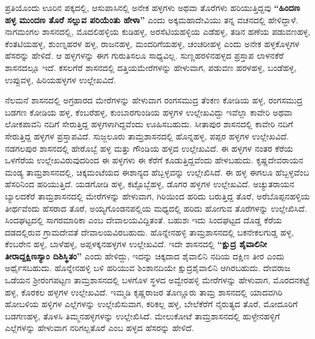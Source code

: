 ಪ್ರತಿಯೊಂದು ಊರಿನ ಪಕ್ಕದಲ್ಲಿ, ಆಸುಪಾಸಿನಲ್ಲಿ ಅನೇಕ ಹಳ್ಳಗಳು ಅಥವಾ ತೊರೆಗಳು ಹರಿಯುತ್ತಿದ್ದವು \textbf{“ಹಿಂದಣ ಹಳ್ಳ ಮುಂದಣ ತೊರೆ ಸಲ್ಲುವ ಪರಿಯೆಂತು ಹೇಳಾ”} ಎಂದು ಅಕ್ಕಮಹಾದೇವಿಯು ತನ್ನ ವಚನದಲ್ಲಿ ಹೇಳಿದ್ದಾಳೆ. ನಾಗಮಂಗಲ ಶಾಸನದಲ್ಲಿ, ಮೊದಲಿಹಳ್ಳಿಯ ಕುಡಿಹಳ್ಳ, ಅರಸೆಟಿಯಹಳ್ಳಿಯ ಎಡೆಹಳ್ಳ, ತಡಿನ ಹಣೆಯ ಪಡುವಣಹಳ್ಳ, ಕೆಂತಟಿಯಹಳ್ಳ, ಶುಂಣ್ನಹರಳ ಹಳ್ಳ, ರಾಜನಹಳ್ಳ, ಮಂದರಿಗೆಯಹಳ್ಳ, ಚಂಚರೀಹಳ್ಳ ಎಂದು ಅನೇಕ ಹಳ್ಳಕೊಳ್ಳಗಳ ಹೆಸರನ್ನು ಹೇಳಿದೆ. ಆ ಹಳ್ಳಗಳನ್ನು ಈಗ ಗುರುತಿಸಲೂ ಸಾಧ್ಯವಿಲ್ಲ. ಸುಣ್ಣಹರಳಿನಹಳ್ಳದ ಪ್ರಸ್ತಾಪ ಲಾಳನಕೆರೆ ಶಾಸನದಲ್ಲೂ ಇದೆ. ಕಸಲಗೆರೆ ಶಾಸನದಲ್ಲಿ ದತ್ತಿಯಮೇರೆಗಳನ್ನು ಹೇಳುವಾಗ, ಪಡುವಣ ಹರಳಹಳ್ಳ, ಬಂಡೆಹಳ್ಳ, ಉಪ್ಪುವಳ್ಳ, ಹಿರಿಯಹಳ್ಳಗಳ ಉಲ್ಲೇಖವಿದೆ.

ನೆಲಮನೆ ಶಾಸನದಲ್ಲಿ ಅಗ್ರಹಾರದ ಮೇರೆಗಳನ್ನು ಹೇಳುವಾಗ ರಂಗಸಮುದ್ರ ತೆಂಕಣ ಕೋಡಿಯ ಹಳ್ಳ, ರಂಗಸಮುದ್ರ ಬಡಗಣ ಕೋಡಿಯ ಹಳ್ಳ, ಕೆಂಬರೆಹಳ್ಳ, ಕುಂಬಾರಗುಂಡಿಯ ಹಳ್ಳಗಳ ಉಲ್ಲೇಖವಿದ್ದು ಇವೆಲ್ಲಾ ಕಾವೇರಿ ಅಥವಾ ಲೋಕಪಾವನಿ ನದಿಗೆ ಸೇರುತ್ತಿದ್ದ ಹಳ್ಳಗಳಾಗಿದ್ದವೆಂದು ಊಹಿಸಬಹುದು. ಸೀತಾಪುರ ಶಾಸನದಲ್ಲಿ ಕಾವೇರಿ ನದಿಗೆ ಸೇರುತ್ತಿದ್ದ ಹಳ್ಳಗಳ ಪ್ರಸ್ತಾಪವಿದೆ. ಸುಜ್ಜಲೂರು ತಾಮ್ರಶಾಸನದಲ್ಲಿ ಹೊನ್ನಹಳ್ಳ, ಪಪ್ಪರ ಹಳ್ಳಗಳ ಉಲ್ಲೇಖವಿದೆ. ನಡಗಲಪುರ ಶಾಸನದಲ್ಲಿ ಹೇರೊಬ್ಬೆ ಹಳ್ಳ ಮತ್ತು ಗೌಂಡಿಯ ಹಳ್ಳದ ಉಲ್ಲೇಖವಿದೆ. ಈ ಹಳ್ಳಗಳ ನಂತರ ಕೆರೆಯ ಒಳಗೆರೆಯ ಉಲ್ಲೇಖವಿರುವುದರಿಂದ ಈ ಹಳ್ಳಗಳು ಈ ಕೆರೆಗೆ ಕೂಡುತ್ತಿದ್ದವೆಂದು ಹೇಳಬಹುದು. ಕೃಷ್ಣದೇವರಾಯನ ಮಂಡ್ಯ ತಾಮ್ರಶಾಸನದಲ್ಲಿ, ಚಿಕ್ಕಮಂಟೆಯದ ಈಶಾನ್ಯದ ಹೆಬ್ಬಳ್ಳವನ್ನು ಉಲ್ಲೇಖಿಸಿದೆ. ಈ ಹಳ್ಳ ಈಗಲೂ ಹೆಬ್ಬಳ್ಳವೆಂಬ ಹೆಸರಿನಿಂದ ಹರಿಯುತ್ತಿದೆ. ಯಡಗೋಡಿ ಹಳ್ಳ, ಕಟ್ಟೊಬ್ಬೆ\-ಹಳ್ಳ, ಡೊಗರ ಹಳ್ಳಗಳ ಉಲ್ಲೇಖವಿದೆ. ಅಚ್ಯುತರಾಯನ ಬ್ಯಾಲದಕೆರೆ ತಾಮ್ರಶಾಸನದಲ್ಲಿ ಮೇರೆಗಳನ್ನು ಹೇಳುವಾಗ, ಗಿರಿಯಿಂದ ಹರಿದು ಬರುತ್ತಿದ್ದ ತೊರೆ, ಅರೆಬೊಪ್ಪನಹಳ್ಳಿಯ ತೀರ್ಥವೆಂದು ಹೆಸರಾದ ತೊರೆ, ಅಯ್ಯಗೊಂಡನಪಲ್ಲಿಯ ಮಧ್ಯದಲ್ಲಿ ಹರಿದು ಹೋಗುವ ತೊರೆಗಳನ್ನು ಉಲ್ಲೇಖಿಸಿದೆ. ಸಿಂದಘಟ್ಟದಲ್ಲಿ ಸಾಗರಮಾರಿಕಾ ಎಂಬ ದೇವಾಲಯವಿದ್ದಿತಂತೆ. ಬಹುಶಃ ಇದು ಸಿಂದಘಟ್ಟದ ದೊಡ್ಡ ಕೆರೆಯ ದಡದಲ್ಲಿರುವ ಗ್ರಾಮದೇವತೆ ದೇವಾಲಯವಿರಬಹುದು. ಹೊನ್ನೇನಹಳ್ಳಿ ತಾಮ್ರಶಾಸನದಲ್ಲಿ ಬಕನೇಕಲಗುಡ್ಡ ಹಳ್ಳ, ಕೆಂಬರೇನ ಹಳ್ಳ, ಬಾಳೆಹಳ್ಳ, ಅಪ್ಪಳಕ್ಕನಹಳ್ಳಗಳ ಉಲ್ಲೇಖವಿದೆ. ಇದೇ ಶಾಸನದಲ್ಲಿ \textbf{“ಕ್ಷುದ್ರ ಶೈವಾಲಿನೀ ತೀರಾದ್ದಕ್ಷಿಣಸ್ಯಾಂ ದಿಶಿಸ್ಥಿತಂ”} ಎಂದು ಹೇಳಿದ್ದು, ಇದನ್ನು ಚಿಕ್ಕದಾದ ಶೈವಾಲಿನಿ ನದಿಯ ದಕ್ಷಿಣ ತೀರ ಎಂದು ಅರ್ಥೈಸಬಹುದು. ಹೊನ್ನೇನಹಳ್ಳಿ ಬಳಿ ಹರಿಯುವ ಶಿಂಶಾನದಿಯೇ ಕ್ಷುದ್ರಶೈವಾಲಿನಿ ಆಗಿರಬಹುದು. ದೇವರಾಜ ಒಡೆಯನ ಶ‍್ರೀರಂಗಪಟ್ಟಣ ತಾಮ್ರಶಾಸನದಲ್ಲಿ ಬಳಗೊಳ ಸ್ಥಳದ ಅವ್ವೇರಹಳ್ಳಿ ಮೇರೆಗಳನ್ನು ಹೇಳುವಾಗ, ಮೊರದನಕಟ್ಟೆ ಹಳ್ಳ, ಕೊರಕಲ ಹಳ್ಳಗಳ ಉಲ್ಲೇಖವಿದೆ. ಇಮ್ಮಡಿ ಕೃಷ್ಣರಾಜರ ತೊಣ್ಣೂರು ತಾಮ್ರ ಶಾಸನದಲ್ಲಿ ಯಾದವಗಿರಿ ಹೋಬಳಿಯ ಹಳ್ಳಿಗಳ ಎಲ್ಲೆಗಳನ್ನು ಉಲ್ಲೇಖಿಸುವಾಗ, ಕರಿಕಲ್ಲ ಹಳ್ಳ, ಬೇಲೆಕೆರೆಗೆ ನೈರುತ್ಯದ ತೊರೆ, ಮೋದೂರಿಗೆ ಬಡಗಣಹಳ್ಳ, ತೊಳಸಿ ತಿಮ್ಮನಹಳ್ಳಗಳನ್ನು ಉಲ್ಲೇಖಿಸಿದೆ. ಮೇಲುಕೋಟೆ ತಾಮ್ರಶಾಸನದಲ್ಲಿ ಹುಳ್ಳೇನಹಳ್ಳಿಗೆ ಎಲ್ಲೆಗಳನ್ನು ಹೇಳುವಾಗ ನರಿಗಲ್ಲತೊರೆ ಎಂಬ ಹಳ್ಳದ ಹೆಸರನ್ನು ಹೇಳಿದೆ.

